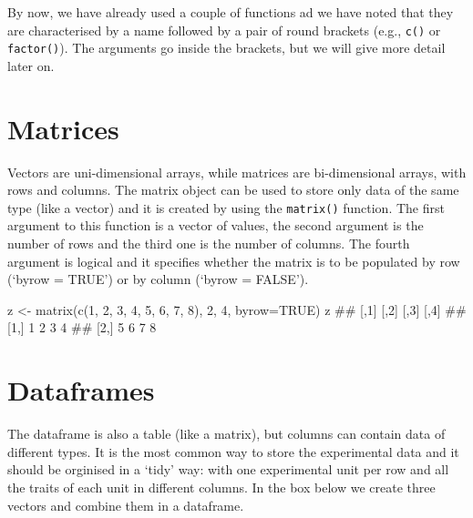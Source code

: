 \documentclass[a4paper,12pt,oneside]{book}
\newenvironment{Shaded}{\begin{snugshade}}{\end{snugshade}}
\newcommand{\DecValTok}[1]{#1}
\newcommand{\ConstantTok}[1]{#1}
\newcommand{\DocumentationTok}[1]{#1}
\newcommand{\OtherTok}[1]{#1}
\newcommand{\FunctionTok}[1]{#1}
\newcommand{\AttributeTok}[1]{#1}
\newcommand{\NormalTok}[1]{#1}
\begin{document}
By now, we have already used a couple of functions ad we have noted that they are characterised by a name followed by a pair of round brackets (e.g., \texttt{c()} or \texttt{factor()}). The arguments go inside the brackets, but we will give more detail later on.

\hypertarget{matrices}{%
\section{Matrices}\label{matrices}}

Vectors are uni-dimensional arrays, while matrices are bi-dimensional arrays, with rows and columns. The matrix object can be used to store only data of the same type (like a vector) and it is created by using the \texttt{matrix()} function. The first argument to this function is a vector of values, the second argument is the number of rows and the third one is the number of columns. The fourth argument is logical and it specifies whether the matrix is to be populated by row (`byrow = TRUE') or by column (`byrow = FALSE').

\begin{Shaded}
\begin{Highlighting}[]
\NormalTok{z  }\OtherTok{\textless{}{-}}  \FunctionTok{matrix}\NormalTok{(}\FunctionTok{c}\NormalTok{(}\DecValTok{1}\NormalTok{, }\DecValTok{2}\NormalTok{, }\DecValTok{3}\NormalTok{, }\DecValTok{4}\NormalTok{, }\DecValTok{5}\NormalTok{, }\DecValTok{6}\NormalTok{, }\DecValTok{7}\NormalTok{, }\DecValTok{8}\NormalTok{),}
              \DecValTok{2}\NormalTok{, }\DecValTok{4}\NormalTok{, }\AttributeTok{byrow=}\ConstantTok{TRUE}\NormalTok{)}
\NormalTok{z}
\DocumentationTok{\#\#      [,1] [,2] [,3] [,4]}
\DocumentationTok{\#\# [1,]    1    2    3    4}
\DocumentationTok{\#\# [2,]    5    6    7    8}
\end{Highlighting}
\end{Shaded}

\hypertarget{dataframes}{%
\section{Dataframes}\label{dataframes}}

The dataframe is also a table (like a matrix), but columns can contain data of different types. It is the most common way to store the experimental data and it should be orginised in a `tidy' way: with one experimental unit per row and all the traits of each unit in different columns. In the box below we create three vectors and combine them in a dataframe.
\end{document}
